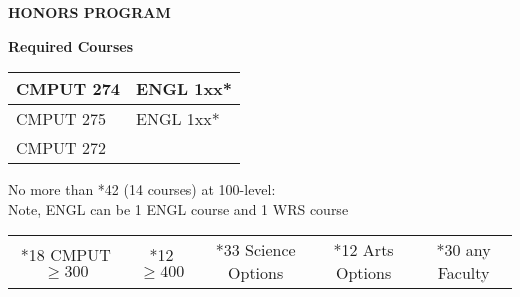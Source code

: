 \documentclass[12pt]{article}
\begin{document}
\begin{center}
    \textbf{HONORS PROGRAM}
\end{center}
\textbf{Required Courses}
\begin{center}
\begin{tabular}{| l | l | }
  \hline
 CMPUT 274\qquad\qquad\qquad\qquad \hfill\raisebox{-3px}{\CheckBox[\symbolchoice{check},height=.25in,width=.25in, name=c]{}} & ENGL 1xx* \qquad\qquad\qquad\qquad\qquad\hfill\raisebox{-3px}{\CheckBox[height=.25in,width=.25in, name=d]{}}\\ 
  \hline
 CMPUT 275 \hfill\raisebox{-3px}{\CheckBox[height=0.25in,width=0.25in, name=a]{}}& ENGL 1xx* \hfill\raisebox{-3px}{\CheckBox[width=0.25in,height=0.25in, name=b]{}}\\
  \hline
 CMPUT 272 \hfill\raisebox{-3px}{\CheckBox[height=0.25in,width=0.25in, name=1]{}}& \\
  \hline
\end{tabular}
\end{center}

\noindent No more than *42 (14 courses) at 100-level: \hfill\raisebox{-3px}{\CheckBox[height=0.25in,width=0.25in, name=209]{}}\\
\noindent *Note, ENGL can be 1 ENGL course and 1 WRS course

\vspace{-1cm}
\begin{center}
\begin{tabular}{c c c c c}
*18 CMPUT $\ge300$ & *12 $\ge400$ & *33 Science Options & *12 Arts Options & *30 any Faculty
\end{tabular}
\end{center}

\vspace{-1cm}
\end{document}
